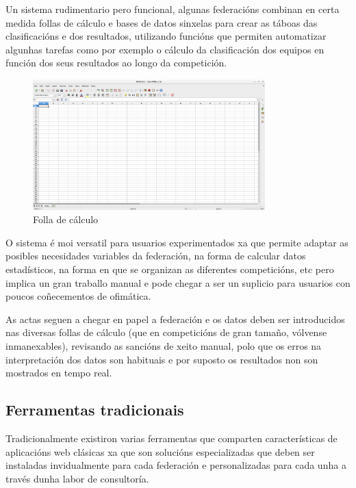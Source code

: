     Un sistema rudimentario pero funcional, algunas federacións combinan en certa medida 
follas de cálculo e bases de datos sinxelas para crear as táboas das 
clasificacións e dos resultados, utilizando funcións que permiten automatizar algunhas 
tarefas como por exemplo o cálculo da clasificación dos equipos en función dos 
seus resultados ao longo da competición.

    \begin{figure}[h!]
	  \begin{center}
	    \includegraphics[width=0.8\textwidth]{./img/calculo.png}
	    \caption{Folla de cálculo}
	    \label{fig:img:calculo}
	  \end{center}
    \end{figure}

    O sistema é moi versatil para usuarios experimentados xa que permite adaptar 
as posibles necesidades variables da federación, na forma de calcular 
datos estadísticos, na forma en que se organizan as diferentes competicións, 
etc pero implica un gran traballo manual e pode chegar a ser un suplicio para 
usuarios con poucos coñecementos de ofimática.

  As actas seguen a chegar en papel a federación e os datos deben ser introducidos nas 
diversas follas de cálculo (que en competicións de gran tamaño, vólvense inmanexables), 
revisando as sancións de xeito manual, polo que os erros na interpretación dos datos son 
habituais e por suposto os resultados non son mostrados en tempo real.

    \subsection{Ferramentas tradicionais}

    Tradicionalmente existiron varias ferramentas que comparten características 
de aplicacións web clásicas xa que son solucións especializadas que deben ser 
instaladas invidualmente para cada federación e personalizadas para cada unha a 
través dunha labor de consultoría.

